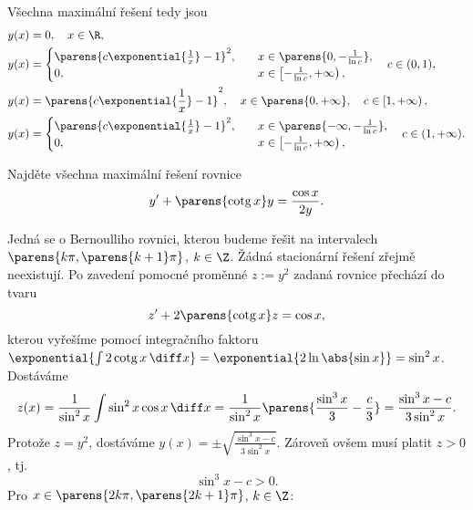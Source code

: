 \documentclass[answers]{exam}
\begin{document}
\begin{questions}
\begin{solution}
  	Všechna maximální řešení tedy jsou
  	\begin{align*}
  		y(x)
  		&=
  		0,
  		\quad x \in \R,
  		\\
  		y(x)
  		&=
  		\begin{cases}
  			\parens{c \exponential{\frac{1}{x}} - 1}^2, &\quad x \in \parens{0, -\frac{1}{\ln c}},
  			\\
  			0, &\quad x \in \left[ -\frac{1}{\ln c}, +\infty \right),
  		\end{cases}
  		\quad c \in (0, 1),
  		\\
  		y(x) 
  		&=
  		\parens{c \exponential{\frac{1}{x}} - 1}^2, \quad x \in \parens{0, +\infty}, \quad c \in \left[ 1, +\infty \right),
  		\\
  		y(x)
  		&=
  		\begin{cases}
  			\parens{c \exponential{\frac{1}{x}} - 1}^2, &\quad x \in \parens{-\infty, -\frac{1}{\ln c}},
  			\\
  			0, &\quad x \in \left[ -\frac{1}{\ln c}, +\infty \right),
  		\end{cases}
  		\quad c \in (1, +\infty).
  	\end{align*} 
	\end{solution}
	
  \question
  Najd\v ete v\v sechna maxim\'aln\'i \v re\v sen\'i rovnice
  \begin{equation*}
    y' + \parens{\operatorname{cotg}x}y
    =
    \frac{\cos x}{2 y}.
  \end{equation*}
	    
  \begin{solution}
  	Jedná se o Bernoulliho rovnici, kterou budeme řešit na intervalech $\parens{k\pi, \parens{k+1}\pi}$, $k \in \Z$.  Žádná stacionární řešení zřejmě neexistují. Po zavedení pomocné proměnné $z:=y^2$ zadaná rovnice přechází do tvaru
	 	\begin{equation*}
	 		z'
	 		+
	 		2 \parens{\operatorname{cotg}x} z
	 		=
	 		\cos x,
	 	\end{equation*}
	 	kterou vyřešíme pomocí integračního faktoru $\exponential{\int 2 \operatorname{cotg}x \, \diff x} = \exponential{2 \ln \abs{\sin x}} = \sin^2 x$. Dostáváme
	 	\begin{equation*}
	 		z(x) 
	 		= 
	 		\frac{1}{\sin^2 x} \int \sin^2 x \cos x \, \diff x
	 		=
	 		\frac{1}{\sin^2 x} \parens{ \frac{\sin^3 x}{3} - \frac{c}{3}}
	 		=
	 		\frac{\sin^3 x - c}{3 \sin^2 x}.
	 	\end{equation*}
  	Protože $z = y^2$, dostáváme $y(x) = \pm \sqrt{\frac{\sin^3 x - c}{3 \sin^2 x}}$. Zároveň ovšem musí platit $z > 0$, tj.
  	\begin{equation}
  		\label{eq:3}
  		\sin^3 x - c > 0.
  	\end{equation}
  	Pro $x \in \parens{2k\pi, \parens{2k+1}\pi}$, $k \in \Z$:
  	

\end{solution}
\end{questions}
\end{document}

